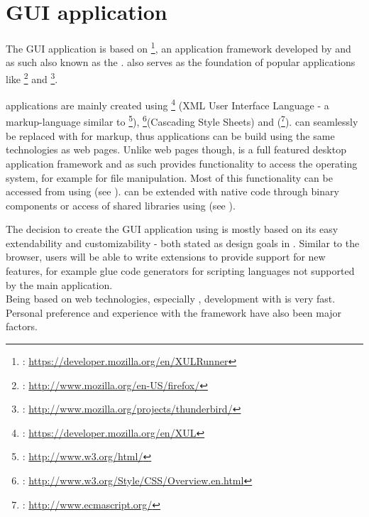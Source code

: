 \chapter{GUI application}
\label{chap:GUIApplication}

The GUI application is based on \footnote{: \url{https://developer.mozilla.org/en/XULRunner}}, an application framework developed by  and as such also known as the .  also serves as the foundation of popular applications like \footnote{: \url{http://www.mozilla.org/en-US/firefox/}} and \footnote{: \url{http://www.mozilla.org/projects/thunderbird/}}. 

 applications are mainly created using \footnote{: \url{https://developer.mozilla.org/en/XUL}} (XML User Interface Language - a markup-language similar to \footnote{: \url{http://www.w3.org/html/}}), \footnote{: \url{http://www.w3.org/Style/CSS/Overview.en.html}}(Cascading Style Sheets) and  (\footnote{: \url{http://www.ecmascript.org/}}).  can seamlessly be replaced with  for markup, thus  applications can be build using the same technologies as web pages. Unlike web pages though,  is a full featured desktop application framework and as such provides functionality to access the operating system, for example for file manipulation. Most of this functionality can be accessed from  using  (see ).  can be extended with native code through  binary components or access of shared libraries using  (see ).

The decision to create the GUI application using  is mostly based on its easy extendability and customizability - both stated as design goals in . Similar to the  browser, users will be able to write extensions to provide support for new features, for example glue code generators for scripting languages not supported by the main application.\\
Being based on web technologies, especially , development with   is very fast.
\\Personal preference and experience with the framework have also been major factors.

